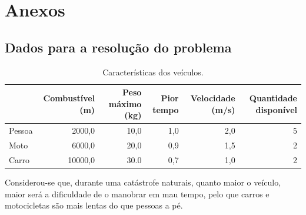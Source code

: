 \documentclass[12pt, a4paper, titlepage]{article}
\begin{document}
\section{Anexos}

\subsection{Dados para a resolução do problema}
\label{problem-data}

\begin{table}[H]
    \small

    \begin{adjustwidth}{-1.5cm}{-1.5cm}
        \begin{center}
            \begin{tabular}{|l|r|r|r|r|r|}
                \hline
                                                &
                    Combustível (m)             &
                    Peso máximo (kg)            &
                    Pior tempo &
                    Velocidade (m/s)            &
                    Quantidade disponível \\

                \hline
                Pessoa & 2000,0  & 10,0 & 1,0 & 2,0 & 5 \\
                \hline
                Moto   & 6000,0  & 20,0 & 0,9 & 1,5 & 2 \\
                \hline
                Carro  & 10000,0 & 30.0 & 0,7 & 1,0 & 2 \\
                \hline
            \end{tabular}
        \end{center}
    \end{adjustwidth}

    \caption{Características dos veículos.}
\end{table}

Considerou-se que, durante uma catástrofe naturais, quanto maior o veículo, maior será a dificuldade
de o manobrar em mau tempo, pelo que carros e motocicletas são mais lentas do que pessoas a pé.
\end{document}
